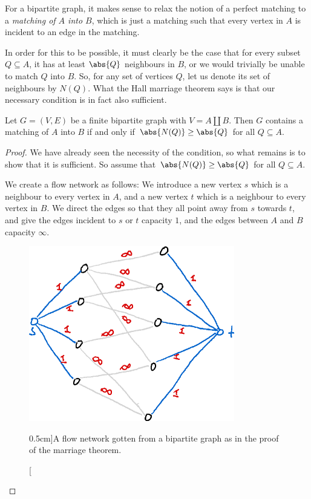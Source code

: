 \documentclass[nobib]{tufte-handout}
\begin{document}
For a bipartite graph, it makes sense to relax the notion of a perfect matching to a \emph{matching of $A$ into $B$}, which is just a matching such that every vertex in $A$ is incident to an edge in the matching.

In order for this to be possible, it must clearly be the case that for every subset $Q \subseteq A$, it has at least $\abs{Q}$ neighbours in $B$, or we would trivially be unable to match $Q$ into $B$. So, for any set of vertices $Q$, let us denote its set of neighbours by $N(Q)$. What the Hall marriage theorem says is that our necessary condition is in fact also sufficient.

\begin{theorem}
    Let $G = (V,E)$ be a finite bipartite graph with $V = A \coprod B$. Then $G$ contains a matching of $A$ into $B$ if and only if $\abs{N(Q)} \geq \abs{Q}$ for all $Q \subseteq A$.

    \begin{proof}
        We have already seen the necessity of the condition, so what remains is to show that it is sufficient. So assume that $\abs{N(Q)} \geq \abs{Q}$ for all $Q \subseteq A$.

        We create a flow network as follows: We introduce a new vertex $s$ which is a neighbour to every vertex in $A$, and a new vertex $t$ which is a neighbour to every vertex in $B$. We direct the edges so that they all point away from $s$ towards $t$, and give the edges incident to $s$ or $t$ capacity $1$, and the edges between $A$ and $B$ capacity $\infty$.

        \begin{figure}
            \centering
            \includegraphics[width=0.8\textwidth]{graphics/L7_flows/flow_from_bipartite.png}
            \caption[][0.5cm]{A flow network gotten from a bipartite graph as in the proof of the marriage theorem.}
            \label{fig:flow_from_bipartite}
        \end{figure}


\end{proof}
\end{theorem}
\end{document}
